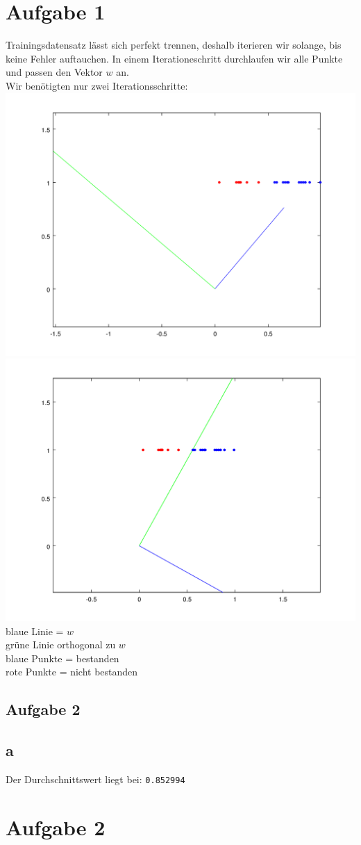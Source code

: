 \documentclass[a4paper,10pt]{article}
\begin{document}
\section{Aufgabe 1}
	Trainingsdatensatz lässt sich perfekt trennen,
	deshalb iterieren wir solange, bis keine Fehler auftauchen.
	In einem Iterationeschritt durchlaufen wir alle Punkte und passen
	den Vektor $w$ an.\\
	Wir benötigten nur zwei Iterationsschritte:\\
	\includegraphics[scale=0.4]{aufg1_iteration1}\\
	\includegraphics[scale=0.4]{aufg1_iteration2}\\
	blaue Linie = $w$\\
	grüne Linie orthogonal zu $w$\\
	blaue Punkte = bestanden\\
	rote Punkte = nicht bestanden\\

\subsection{Aufgabe 2}
	\subsection{a}
		Der Durchschnittswert liegt bei:
		\texttt{0.852994}

\section{Aufgabe 2}
	
\end{document}
